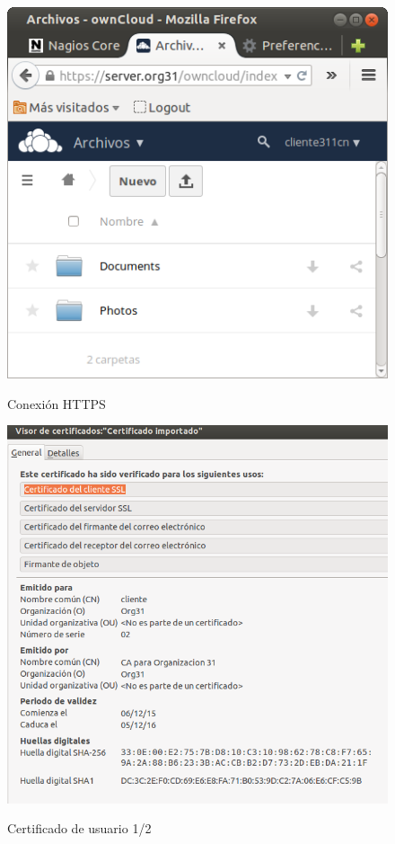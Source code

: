 \documentclass[]{article}
\begin{document}
\begin{figure}[h]
	\caption{Conexión HTTPS}
	\centering
	\includegraphics[scale=0.5]{images/certs/https.png}
	\label{fig:https}
\end{figure}

\begin{figure}[h]
	\caption{Certificado de usuario 1/2}
	\centering
	\includegraphics[scale=0.5]{images/certs/usercert1.png}
	\label{fig:usercert1}
\end{figure}
\end{document}
